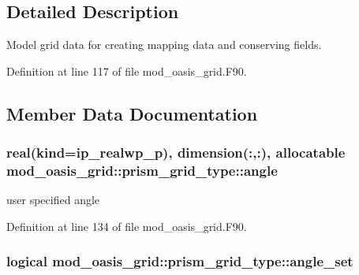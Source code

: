 \subsection{Detailed Description}
Model grid data for creating mapping data and conserving fields. 

Definition at line 117 of file mod\+\_\+oasis\+\_\+grid.\+F90.



\subsection{Member Data Documentation}
\hypertarget{structmod__oasis__grid_1_1prism__grid__type_a3d12bed9920fed609d83b04ab3fbc5b2}{
\subsubsection[{angle}]{\setlength{\rightskip}{0pt plus 5cm}real(kind=ip\+\_\+realwp\+\_\+p), dimension(\+:,\+:), allocatable mod\+\_\+oasis\+\_\+grid\+::prism\+\_\+grid\+\_\+type\+::angle\hspace{0.3cm}{\ttfamily [private]}}}\label{structmod__oasis__grid_1_1prism__grid__type_a3d12bed9920fed609d83b04ab3fbc5b2}


user specified angle 



Definition at line 134 of file mod\+\_\+oasis\+\_\+grid.\+F90.

\hypertarget{structmod__oasis__grid_1_1prism__grid__type_a4a357fd1eb4b19d1beea5968dd783882}{
\subsubsection[{angle\+\_\+set}]{\setlength{\rightskip}{0pt plus 5cm}logical mod\+\_\+oasis\+\_\+grid\+::prism\+\_\+grid\+\_\+type\+::angle\+\_\+set\hspace{0.3cm}{\ttfamily [private]}}}\label{structmod__oasis__grid_1_1prism__grid__type_a4a357fd1eb4b19d1beea5968dd783882}


